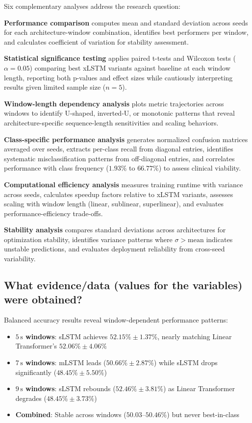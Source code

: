 Six complementary analyses address the research question:

\textbf{Performance comparison} computes mean and standard deviation across seeds for each architecture-window combination, identifies best performers per window, and calculates coefficient of variation for stability assessment.

\textbf{Statistical significance testing} applies paired t-tests and Wilcoxon tests ($\alpha=0.05$) comparing best \ac{xLSTM} variants against baseline at each window length, reporting both p-values and effect sizes while cautiously interpreting results given limited sample size ($n=5$).

\textbf{Window-length dependency analysis} plots metric trajectories across windows to identify U-shaped, inverted-U, or monotonic patterns that reveal architecture-specific sequence-length sensitivities and scaling behaviors.

\textbf{Class-specific performance analysis} generates normalized confusion matrices averaged over seeds, extracts per-class recall from diagonal entries, identifies systematic misclassification patterns from off-diagonal entries, and correlates performance with class frequency ($1.93\%$ to $66.77\%$) to assess clinical viability.

\textbf{Computational efficiency analysis} measures training runtime with variance across seeds, calculates speedup factors relative to \ac{xLSTM} variants, assesses scaling with window length (linear, sublinear, superlinear), and evaluates performance-efficiency trade-offs.

\textbf{Stability analysis} compares standard deviations across architectures for optimization stability, identifies variance patterns where $\sigma > \text{mean}$ indicates unstable predictions, and evaluates deployment reliability from cross-seed variability.

\subsection{What evidence/data (values for the variables) were obtained?}

Balanced accuracy results reveal window-dependent performance patterns:
\begin{itemize}
    \item \textbf{$5\,\text{s}$ windows}: \ac{sLSTM} achieves $52.15\% \pm 1.37\%$, nearly matching Linear Transformer's $52.06\% \pm 4.06\%$
    \item \textbf{$7\,\text{s}$ windows}: \ac{mLSTM} leads ($50.66\% \pm 2.87\%$) while \ac{sLSTM} drops significantly ($48.45\% \pm 5.50\%$)
    \item \textbf{$9\,\text{s}$ windows}: \ac{sLSTM} rebounds ($52.46\% \pm 3.81\%$) as Linear Transformer degrades ($48.45\% \pm 3.73\%$)
    \item \textbf{Combined}: Stable across windows ($50.03$--$50.46\%$) but never best-in-class
\end{itemize}

